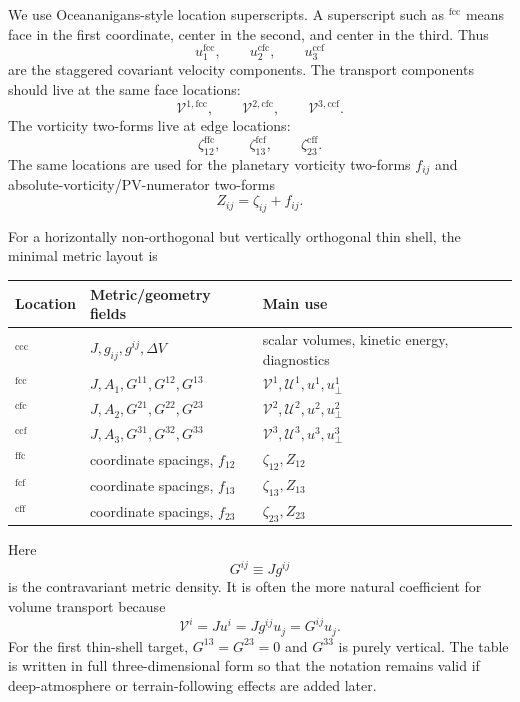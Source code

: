 \documentclass[11pt]{article}
\newcommand{\mc}[1]{\mathcal{#1}}
\newcommand{\Vflux}{\mc{V}}
\newcommand{\Uflux}{\mc{U}}
\newcommand{\loc}[1]{^{\mathrm{#1}}}
\begin{document}
We use Oceananigans-style location superscripts.  A superscript such as \(\loc{fcc}\) means face in the first coordinate, center in the second, and center in the third.  Thus
\begin{equation}
  u_1\loc{fcc}, \qquad u_2\loc{cfc}, \qquad u_3\loc{ccf}
\end{equation}
are the staggered covariant velocity components.  The transport components should live at the same face locations:
\begin{equation}
  \Vflux^{1,\mathrm{fcc}},\qquad
  \Vflux^{2,\mathrm{cfc}},\qquad
  \Vflux^{3,\mathrm{ccf}}.
\end{equation}
The vorticity two-forms live at edge locations:
\begin{equation}
  \zeta_{12}\loc{ffc}, \qquad
  \zeta_{13}\loc{fcf}, \qquad
  \zeta_{23}\loc{cff}.
\end{equation}
The same locations are used for the planetary vorticity two-forms \(f_{ij}\) and absolute-vorticity/PV-numerator two-forms
\begin{equation}
  Z_{ij} = \zeta_{ij} + f_{ij}.
\end{equation}

For a horizontally non-orthogonal but vertically orthogonal thin shell, the minimal metric layout is
\begin{center}
\begin{tabular}{lll}
\toprule
Location & Metric/geometry fields & Main use \\
\midrule
\(\loc{ccc}\) & \(J, g_{ij}, g^{ij}, \Delta V\) & scalar volumes, kinetic energy, diagnostics \\
\(\loc{fcc}\) & \(J, A_1, G^{11},G^{12},G^{13}\) & \(\Vflux^1,\Uflux^1,u^1,u_\perp^1\) \\
\(\loc{cfc}\) & \(J, A_2, G^{21},G^{22},G^{23}\) & \(\Vflux^2,\Uflux^2,u^2,u_\perp^2\) \\
\(\loc{ccf}\) & \(J, A_3, G^{31},G^{32},G^{33}\) & \(\Vflux^3,\Uflux^3,u^3,u_\perp^3\) \\
\(\loc{ffc}\) & coordinate spacings, \(f_{12}\) & \(\zeta_{12},Z_{12}\) \\
\(\loc{fcf}\) & coordinate spacings, \(f_{13}\) & \(\zeta_{13},Z_{13}\) \\
\(\loc{cff}\) & coordinate spacings, \(f_{23}\) & \(\zeta_{23},Z_{23}\) \\
\bottomrule
\end{tabular}
\end{center}
Here
\begin{equation}
  G^{ij} \equiv J g^{ij}
\end{equation}
is the contravariant metric density.  It is often the more natural coefficient for volume transport because
\begin{equation}
  \Vflux^i = J u^i = Jg^{ij}u_j = G^{ij}u_j.
\end{equation}
For the first thin-shell target, \(G^{13}=G^{23}=0\) and \(G^{33}\) is purely vertical.  The table is written in full three-dimensional form so that the notation remains valid if deep-atmosphere or terrain-following effects are added later.
\end{document}
